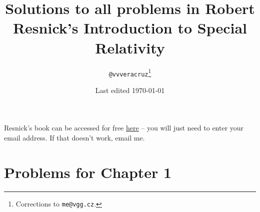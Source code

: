 \documentclass[a4paper]{article}
\title{Solutions to all problems in Robert Resnick's Introduction to Special Relativity}
\date{Last edited \today}
\author{\texttt{@vvveracruz}\thanks{Corrections to \texttt{me@vgg.cz}.}}
\begin{document}
\maketitle

Resnick's book can be accessed for free \href{https://www.academia.edu/37630461/Robert_Resnick_-_Introduction_to_Special_Relativity_1968_Wiley_.pdf?auto=download}{here} -- you will just need to enter your email address. If that doesn't work, email me.

\section{Problems for Chapter 1}
  

\printbibliography
{}
\end{document}
